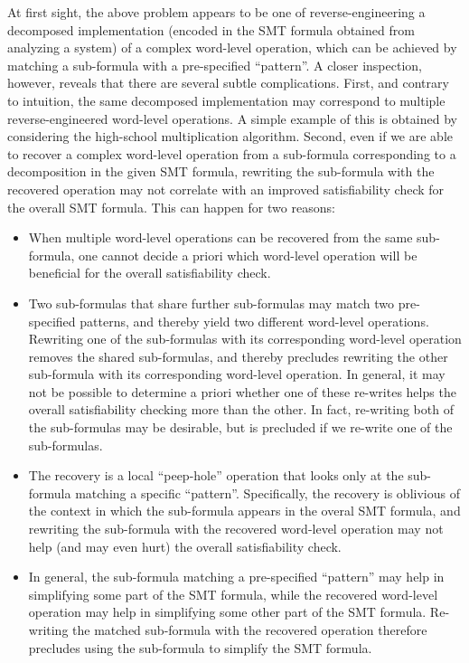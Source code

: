 At first sight, the above problem appears to be one of
reverse-engineering a decomposed implementation (encoded in the SMT
formula obtained from analyzing a system) of a complex word-level
operation, which can be achieved by matching a sub-formula with a
pre-specified ``pattern''.  A closer inspection, however, reveals that
there are several subtle complications. First, and contrary to
intuition, the same decomposed implementation may correspond to
multiple reverse-engineered word-level operations.  A simple example
of this is obtained by considering the high-school multiplication
algorithm.  Second, even if we are able to recover a complex
word-level operation from a sub-formula corresponding to a
decomposition in the given SMT formula, rewriting the sub-formula with
the recovered operation may not correlate with an improved
satisfiability check for the overall SMT formula.  This can happen for
two reasons:
\begin{itemize}
\item When multiple word-level operations can be recovered from the
  same sub-formula, one cannot decide a priori which word-level
  operation will be beneficial for the overall satisfiability check.
\item Two sub-formulas that share further sub-formulas may match two
  pre-specified patterns, and thereby yield two different word-level
  operations.  Rewriting one of the sub-formulas with its
  corresponding word-level operation removes the shared sub-formulas,
  and thereby precludes rewriting the other sub-formula with its
  corresponding word-level operation.  In general, it may not be
  possible to determine a priori whether one of these re-writes helps
  the overall satisfiability checking more than the other.  In fact,
  re-writing both of the sub-formulas may be desirable, but is 
  precluded if we re-write one of the sub-formulas.
\item The recovery is a local ``peep-hole'' operation that looks only
  at the sub-formula matching a specific ``pattern''.  Specifically,
  the recovery is oblivious of the context in which the sub-formula
  appears in the overal SMT formula, and rewriting the sub-formula
  with the recovered word-level operation may not help (and may even
  hurt) the overall satisfiability check.  
\item In general, the sub-formula matching a pre-specified ``pattern''
  may help in simplifying some part of the SMT formula, while the
  recovered word-level operation may help in simplifying some other
  part of the SMT formula.  Re-writing the matched sub-formula with
  the recovered operation therefore precludes using the sub-formula
  to simplify the SMT formula.
\end{itemize}


